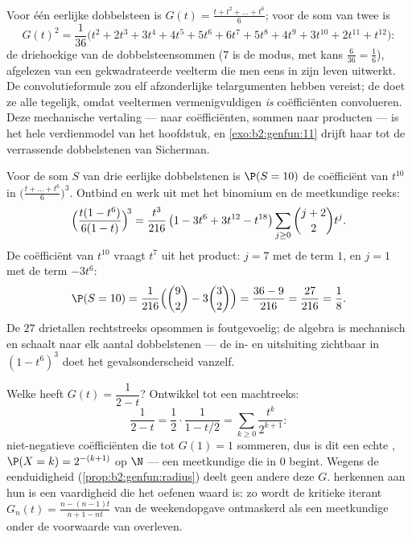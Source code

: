 \begin{example}\label{ex:b2:genfun:twodice}
Voor één eerlijke dobbelsteen is $G(t) = \frac{t + t^2 + \dots +
t^6}{6}$; voor de som van twee is
\[
G(t)^2 = \frac{1}{36}\bigl(t^2 + 2t^3 + 3t^4 + 4t^5 + 5t^6 +
6t^7 + 5t^8 + 4t^9 + 3t^{10} + 2t^{11} + t^{12}\bigr) :
\]
de driehoekige  van de dobbelsteensommen ($7$ is de modus,
met kans $\frac6{36} = \frac16$), afgelezen van een gekwadrateerde
veelterm die men eens in zijn leven uitwerkt. De convolutieformule
zou elf afzonderlijke telargumenten hebben vereist; de  doet ze alle tegelijk, omdat veeltermen vermenigvuldigen
\emph{is} coëfficiënten convolueren. Deze mechanische vertaling ---
 naar coëfficiënten, sommen naar producten --- is het
hele verdienmodel van het hoofdstuk, en
\cref{exo:b2:genfun:11} drijft haar tot de verrassende
dobbelstenen van Sicherman.
\end{example}

\begin{example}\label{ex:b2:genfun:threedice}
Voor de som $S$ van drie eerlijke dobbelstenen is $\P(S = 10)$ de
coëfficiënt van $t^{10}$ in $\bigl(\frac{t + \dots + t^6}6\bigr)^3$.
Ontbind en werk uit met het binomium en de meetkundige reeks:
\[
\Bigl(\frac{t(1 - t^6)}{6(1 - t)}\Bigr)^{\!3}
= \frac{t^3}{216}\,\bigl(1 - 3t^6 + 3t^{12} -
t^{18}\bigr)\sum_{j\geq0}\binom{j+2}2t^j .
\]
De coëfficiënt van $t^{10}$ vraagt $t^7$ uit het product: $j = 7$
met de term $1$, en $j = 1$ met de term $-3t^6$:
\[
\P(S = 10) = \frac{1}{216}\Bigl(\binom92 -
3\binom32\Bigr) = \frac{36 - 9}{216} = \frac{27}{216} =
\frac18 .
\]
De $27$ drietallen rechtstreeks opsommen is foutgevoelig; de
algebra is mechanisch en schaalt naar elk aantal dobbelstenen ---
de in- en uitsluiting zichtbaar in $(1 - t^6)^3$ doet het
gevalsonderscheid vanzelf.
\end{example}

\begin{example}\label{ex:b2:genfun:identify}
Welke  heeft $G(t) = \dfrac1{2 - t}$? Ontwikkel tot een
machtreeks:
\[
\frac{1}{2 - t} = \frac12\cdot\frac1{1 - t/2}
= \sum_{k\geq0}\frac{t^k}{2^{k+1}} :
\]
niet-negatieve coëfficiënten die tot $G(1) = 1$ sommeren, dus is
dit een echte , $\P(X = k) = 2^{-(k+1)}$ op $\N$ --- een
meetkundige  die in $0$ begint. Wegens de eenduidigheid
(\cref{prop:b2:genfun:radius}) deelt geen andere  deze
$G$.  herkennen aan hun  is een
vaardigheid die het oefenen waard is: zo wordt de kritieke iterant
$G_n(t) = \frac{n - (n-1)t}{n+1 - nt}$ van de weekendopgave
ontmaskerd als een meetkundige  onder de voorwaarde van
overleven.
\end{example}


